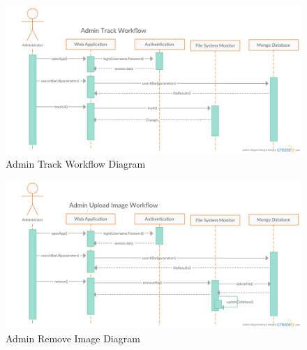 \begin{figure}[h!]
  \begin{center}
    \caption{Admin Track Workflow Diagram}
    \includegraphics[width=\textwidth]{images/Track.jpg}
  \end{center}
\end{figure}

\begin{figure}[h!]
  \begin{center}
    \caption{Admin Remove Image Diagram}
    \includegraphics[width=\textwidth]{images/Remove.jpg}
  \end{center}
\end{figure}
